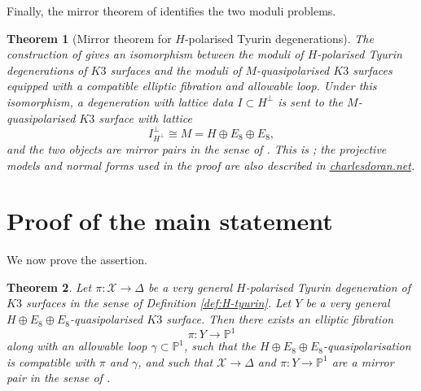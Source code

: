 \documentclass[11pt]{amsart}
\newtheorem{theorem}{Theorem}[section]
\theoremstyle{definition}
\theoremstyle{remark}
\begin{document}
Finally, the mirror theorem of \cite{GT24} identifies the two moduli problems.

\begin{theorem}[Mirror theorem for \(H\)-polarised Tyurin degenerations]
\label{thm:mirror}
The construction of \cite[Section 5]{GT24} gives an isomorphism between the
moduli of \(H\)-polarised Tyurin degenerations of \(K3\) surfaces and the moduli
of \(M\)-quasipolarised \(K3\) surfaces equipped with a compatible elliptic
fibration and allowable loop.  Under this isomorphism, a degeneration with
lattice data \(I\subset H^\perp\) is sent to the \(M\)-quasipolarised \(K3\)
surface with lattice
\[
I^\perp_{H^\perp}\cong M=H\oplus E_8\oplus E_8,
\]
and the two objects are mirror pairs in the sense of
\cite[Definition 5.1]{GT24}.  This is \cite[Theorem 5.2]{GT24}; the projective
models and normal forms used in the proof are also described in
\href{https://www.charlesdoran.net/uploads/6/7/5/1/6751141/2311.10394.pdf}{charlesdoran.net}.
\end{theorem}

\section{Proof of the main statement}

We now prove the assertion.

\begin{theorem}
\label{thm:main}
Let \(\pi\colon \mathcal X\to \Delta\) be a very general \(H\)-polarised Tyurin
degeneration of \(K3\) surfaces in the sense of Definition \ref{def:H-tyurin}.
Let \(Y\) be a very general \(H\oplus E_8\oplus E_8\)-quasipolarised \(K3\)
surface.  Then there exists an elliptic fibration
\[
\pi\colon Y\to \mathbb P^1
\]
along with an allowable loop \(\gamma\subset \mathbb P^1\), such that the
\(H\oplus E_8\oplus E_8\)-quasipolarisation is compatible with \(\pi\) and
\(\gamma\), and such that \(\mathcal X\to \Delta\) and \(\pi\colon Y\to\mathbb P^1\)
are a mirror pair in the sense of \cite[Definition 5.1]{GT24}.
\end{theorem}
\end{document}
